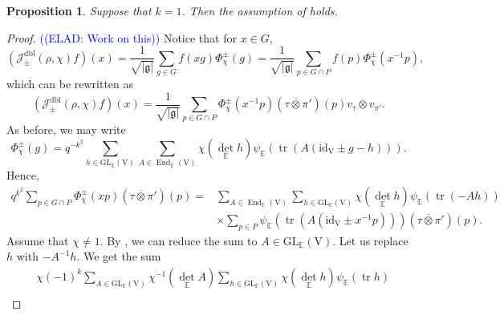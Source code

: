 \documentclass[12pt, reqno]{amsart}
\newtheorem{proposition}[theorem]{Proposition}
\theoremstyle{definition}
\theoremstyle{definition}
\theoremstyle{definition}
\newcommand{\detQuadratic}{{\det}_{\quadraticExtension}}
\newcommand{\EndomorphismRing}{\operatorname{End}}
\newcommand{\idmap}{\mathrm{id}}
\newcommand{\sizeof}[1]{\left|#1\right|}
\newcommand{\hermitianSpace}{\mathrm{V}}
\newcommand{\fieldCharacter}{\psi}
\newcommand{\trace}{\operatorname{tr}}
\newcommand{\GL}{\mathrm{GL}}
\newcommand{\quadraticExtension}{\mathbb{E}}
\newcommand{\dblJacobiSum}[2]{\mathcal{J}_{\pm}^{\mathrm{dbl}}\left(#1, #2\right)}
\newcommand{\genJacobiKernel}[1]{\Phi^{\pm}_{#1}}
\newcommand{\lieAlgebra}{\mathfrak{g}}
\newcommand{\elad}[1]{\textcolor{blue}{\sffamily ((ELAD: #1))}}
\begin{document}
\begin{proposition}
	Suppose that $k=1$. Then the assumption of  holds.
\end{proposition}
\begin{proof}\elad{Work on this}
	Notice that for $x \in G$, $$\left(\dblJacobiSum{\rho}{\chi} f\right)\left(x\right) = \frac{1}{\sqrt{\sizeof{\lieAlgebra}}} \sum_{g \in G} f\left(xg\right) \genJacobiKernel{\chi}\left(g\right) = \frac{1}{\sqrt{\sizeof{\lieAlgebra}}} \sum_{p \in G \cap P} f\left(p\right) \genJacobiKernel{\chi}\left(x^{-1} p\right),$$
	which can be rewritten as
	$$\left(\dblJacobiSum{\rho}{\chi} f\right)\left(x\right) = \frac{1}{\sqrt{\sizeof{\lieAlgebra}}} \sum_{p \in G \cap P}  \genJacobiKernel{\chi}\left(x^{-1} p\right) \left(\tau \overline{\otimes} \pi'\right)\left(p\right) v_\tau \otimes v_{\pi'}.$$
	As before, we may write
	$$\genJacobiKernel{\chi}\left(g\right) = q^{-k^2} \sum_{h \in \GL_{\quadraticExtension}\left(\hermitianSpace\right)} \sum_{A \in \EndomorphismRing_{\quadraticExtension}\left(\hermitianSpace\right)} \chi\left(\detQuadratic h\right) \fieldCharacter_{\quadraticExtension}\left(\trace\left(A \left(\idmap_{\hermitianSpace} \pm g - h \right)\right)\right).$$
	Hence, \begin{align*}
		q^{k^2} \sum_{p \in G \cap P} \genJacobiKernel{\chi}\left(xp\right) \left(\tau \overline{\otimes} \pi'\right)\left(p\right) =& \sum_{A \in \EndomorphismRing_{\quadraticExtension}\left(\hermitianSpace\right)} \sum_{h \in \GL_{\quadraticExtension}\left(\hermitianSpace\right)} \chi\left(\detQuadratic h\right)\fieldCharacter_{\quadraticExtension}\left(\trace\left(-Ah\right)\right) \\
		& \times \sum_{p \in P} \fieldCharacter_{\quadraticExtension}\left(\trace\left(A \left(\idmap_{\hermitianSpace} \pm x^{-1} p\right)\right)\right) \left(\tau \overline{\otimes} \pi'\right)\left(p\right).
	\end{align*}
	Assume that $\chi \ne 1$. By , we can reduce the sum to $A \in \GL_{\quadraticExtension}\left(\hermitianSpace\right)$. Let us replace $h$ with $-A^{-1} h$. We get the sum
	\begin{align*}
		& \chi\left(-1\right)^k \sum_{A \in \GL_{\quadraticExtension}\left(\hermitianSpace\right)} \chi^{-1}\left(\detQuadratic A\right) \sum_{h \in \GL_{\quadraticExtension}\left(\hermitianSpace\right)} \chi\left(\detQuadratic h\right)\fieldCharacter_{\quadraticExtension}\left(\trace h\right)\\

\end{align*}
\end{proof}
\end{document}
